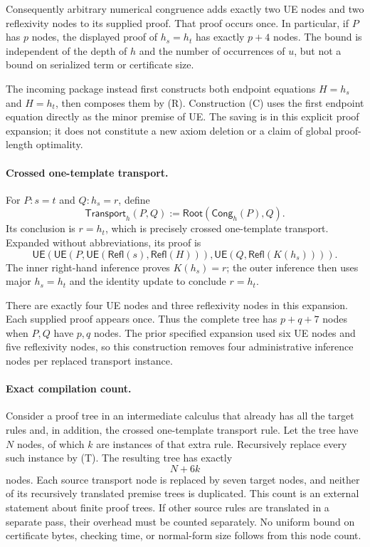 Consequently arbitrary numerical congruence adds exactly two UE nodes
and two reflexivity nodes to its supplied proof.  That proof occurs
once.  In particular, if \(P\) has \(p\) nodes, the displayed proof of
\(h_s=h_t\) has exactly \(p+4\) nodes.  The bound is independent of the
depth of \(h\) and the number of occurrences of \(u\), but not a bound
on serialized term or certificate size.

The incoming package instead first constructs both endpoint equations
\(H=h_s\) and \(H=h_t\), then composes them by (R).  Construction (C)
uses the first endpoint equation directly as the minor premise of UE.
The saving is in this explicit proof expansion; it does not constitute
a new axiom deletion or a claim of global proof-length optimality.

\paragraph{Crossed one-template transport.}
For \(P:s=t\) and \(Q:h_s=r\), define
\[
 \mathsf{Transport}_h(P,Q)
   :=\mathsf{Root}(\mathsf{Cong}_h(P),Q).
 \tag{T}
\]
Its conclusion is \(r=h_t\), which is precisely crossed one-template
transport.  Expanded without abbreviations, its proof is
\[
 \mathsf{UE}\!\left(
   \mathsf{UE}\!\left(
      P,\mathsf{UE}(\mathsf{Refl}(s),\mathsf{Refl}(H))
   \right),
   \mathsf{UE}\!\left(Q,\mathsf{Refl}(K(h_s))\right)
 \right).
\]
The inner right-hand inference proves \(K(h_s)=r\); the outer inference
then uses major \(h_s=h_t\) and the identity update to conclude
\(r=h_t\).

There are exactly four UE nodes and three reflexivity nodes in this
expansion.  Each supplied proof appears once.  Thus the complete tree
has \(p+q+7\) nodes when \(P,Q\) have \(p,q\) nodes.  The prior specified
expansion used six UE nodes and five reflexivity nodes, so this
construction removes four administrative inference nodes per replaced
transport instance.

\paragraph{Exact compilation count.}
Consider a proof tree in an intermediate calculus that already has all
the target rules and, in addition, the crossed one-template transport
rule.  Let the tree have \(N\) nodes, of which \(k\) are instances of
that extra rule.  Recursively replace every such instance by (T).
The resulting tree has exactly
\[
                         N+6k
\]
nodes.  Each source transport node is replaced by seven target nodes,
and neither of its recursively translated premise trees is duplicated.
This count is an external statement about finite proof trees.  If
other source rules are translated in a separate pass, their overhead
must be counted separately.  No uniform bound on certificate bytes,
checking time, or normal-form size follows from this node count.

